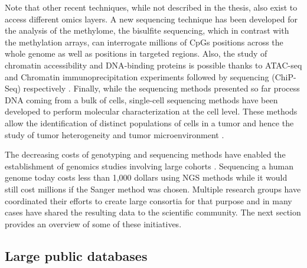 Note that other recent techniques, while not described in the thesis, also exist to access different omics layers. A new sequencing technique has been developed for the analysis of the methylome, the bisulfite sequencing, which in contrast with the methylation arrays, can interrogate millions of \gls{CpG}s positions across the whole genome as well as positions in targeted regions. Also, the study of chromatin accessibility and \gls*{DNA}-binding proteins is possible thanks to \gls{ATAC-seq} and Chromatin immunoprecipitation experiments followed by sequencing (\gls{ChiP-Seq}) respectively \cite{Furey2012,Yan2020}. Finally, while the sequencing methods presented so far process \gls*{DNA} coming from a bulk of cells, single-cell sequencing methods have been developed to perform molecular characterization at the cell level. These methods allow the identification of distinct populations of cells in a tumor and hence the study of tumor heterogeneity and tumor microenvironment \cite{Hwang2018,Finotello2019}.

The decreasing costs of genotyping and sequencing methods have enabled the establishment of genomics studies involving large cohorts \cite{Wetterstrand}. Sequencing a human genome today costs less than 1,000 dollars using \gls{NGS} methods while it would still cost millions if the Sanger method was chosen. Multiple research groups have coordinated their efforts to create large consortia for that purpose and in many cases have shared the resulting data to the scientific community. The next section provides an overview of some of these initiatives.


\subsection{Large public databases}

